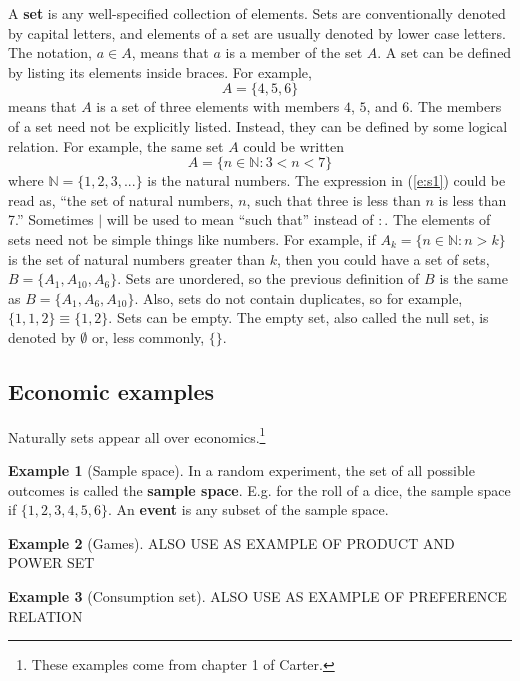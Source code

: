 \documentclass[12pt,reqno]{amsart}
\theoremstyle{definition}
\newtheorem{example}{Example}[section]
\begin{document}
A \textbf{set} is any well-specified collection of
elements. Sets are conventionally denoted by capital letters, and
elements of a set are usually denoted by lower case letters. The
notation, $a \in A$, means that $a$ is a member of the set $A$. A set
can be defined by listing its elements inside braces. For example,
\[ A = \{ 4, 5, 6 \} \]
means that $A$ is a set of three elements with members $4$, $5$, and
$6$. The members of a set need not be explicitly listed. Instead, they
can be defined by some logical relation. For example, the same set $A$
could be written
\begin{equation}
  A = \{ n \in \mathbb{N} : 3 < n < 7 \}  \label{e:s1}
\end{equation}
where $\mathbb{N} = \{1, 2, 3, ... \}$ is the natural numbers. The
expression in (\ref{e:s1}) could be read as, ``the set of natural
numbers, $n$, such that three is less than $n$ is less than 7.''
Sometimes $|$ will be used to mean ``such that'' instead of $:$. The
elements of sets need not be simple things like numbers. For example,
if $A_k = \{ n \in \mathbb{N}: n > k \}$ is the set of natural numbers
greater than $k$, then you could have a set of sets, $B = \{ A_1,
A_{10}, A_{6} \}$.  Sets are unordered, so the previous definition of
$B$ is the same as $B = \{ A_1, A_6, A_{10} \}$. Also, sets do not
contain duplicates, so for example, $\{ 1, 1, 2 \} \equiv \{1, 2
\}$. Sets can be empty. The empty set, also called the null set, is
denoted by $\emptyset$ or, less commonly, $\{ \}$.

\subsection{Economic examples}

Naturally sets appear all over economics.\footnote{These examples come
from chapter 1 of Carter.} 
\begin{example}[Sample space]
  In a random experiment, the set of all possible outcomes is called
  the \textbf{sample space}. E.g. for the roll of a dice, the sample
  space if $\{1,2 ,3 , 4, 5, 6\}$. An \textbf{event} is any subset of
  the sample space.
\end{example}

\begin{example}[Games]
  ALSO USE AS EXAMPLE OF PRODUCT AND POWER SET
\end{example}

\begin{example}[Consumption set]
  ALSO USE AS EXAMPLE OF PREFERENCE RELATION
\end{example}
\end{document}
